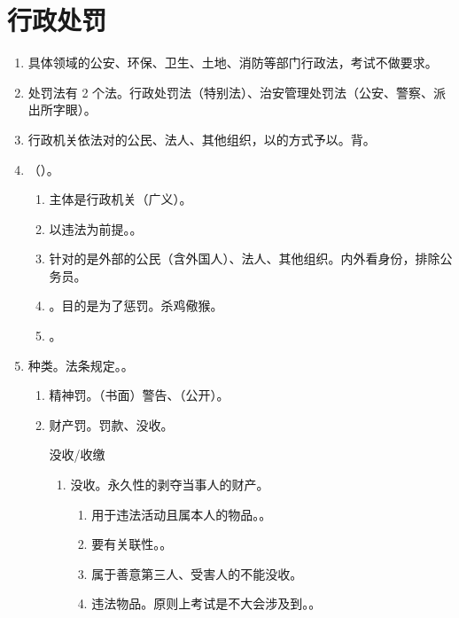 \section{行政处罚}
\begin{enumerate}
  \item 具体领域的公安、环保、卫生、土地、消防等部门行政法，考试不做要求。
  \item 处罚法有 2 个法。行政处罚法（特别法）、治安管理处罚法（公安、警察、派出所字眼）。
  \item 行政机关依法对的公民、法人、其他组织，以的方式予以。背。
  \item {}（）。
        \begin{enumerate}
          \item 主体是行政机关（广义）。
          \item 以违法为前提。。
          \item 针对的是外部的公民（含外国人）、法人、其他组织。内外看身份，排除公务员。
          \item {}。目的是为了惩罚。杀鸡儆猴。
          \item {}。
        \end{enumerate}
  \item 种类。法条规定。。
        \begin{enumerate}
          \item 精神罚。（书面）警告、（公开）。
          \item 财产罚。罚款、没收。
                \begin{kk}{没收/收缴}
                  \begin{enumerate}
                    \item 没收。永久性的剥夺当事人的财产。
                          \begin{enumerate}
                            \item 用于违法活动且属本人的物品。。
                            \item 要有关联性。。
                            \item 属于善意第三人、受害人的不能没收。
                            \item 违法物品。原则上考试是不大会涉及到。。

\end{enumerate}
\end{enumerate}
\end{kk}
\end{enumerate}
\end{enumerate}
